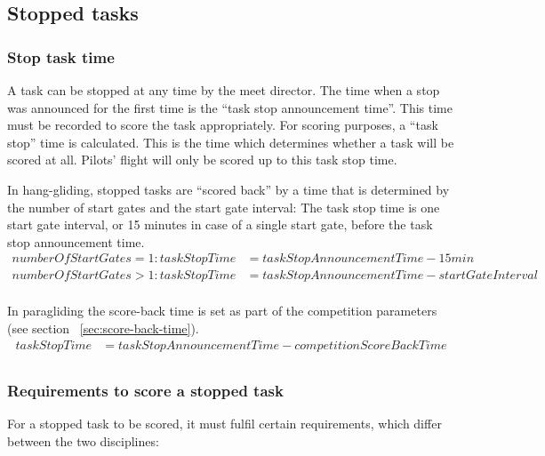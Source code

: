 \documentclass{article}
\begin{document}
\subsection{Stopped tasks}
\subsubsection{Stop task time}
\label{sec:stop-task-time}
A task can be stopped at any time by the meet director. The time when a stop
was announced for the first time is the “task stop announcement time”. This
time must be recorded to score the task appropriately. For scoring purposes,
a “task stop” time is calculated. This is the time which determines whether
a task will be scored at all. Pilots’ flight will only be scored up to this
task stop time.

\begin{hg}
In hang-gliding, stopped tasks are “scored back” by a time that is determined
by the number of start gates and the start gate interval: The task stop time is
one start gate interval, or 15 minutes in case of a single start gate, before
the task stop announcement time.
\begin{align*}
    numberOfStartGates = 1 : taskStopTime &= taskStopAnnouncementTime - 15min \\
    numberOfStartGates > 1 : taskStopTime &= taskStopAnnouncementTime - startGateInterval \\
\end{align*}
\end{hg}

\begin{pg}
In paragliding the score-back time is set as part of the competition parameters
(see section ~\ref{sec:score-back-time}).
\begin{align*}
    taskStopTime &= taskStopAnnouncementTime - competitionScoreBackTime \\
\end{align*}
\end{pg}

\subsubsection{Requirements to score a stopped task}
For a stopped task to be scored, it must fulfil certain requirements, which
differ between the two disciplines:
\end{document}
